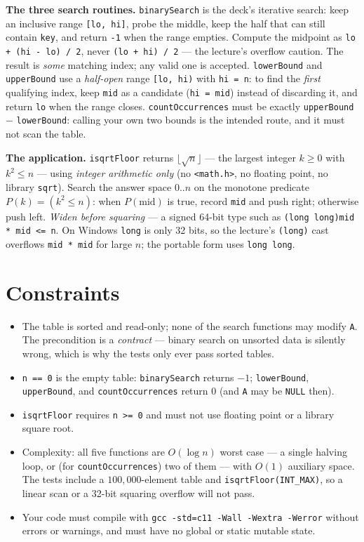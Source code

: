 \documentclass[11pt]{article}
\begin{document}
\textbf{The three search routines.} \texttt{binarySearch} is the deck's iterative search: keep an inclusive range \texttt{[lo, hi]}, probe the middle, keep the half that can still contain \texttt{key}, and return \texttt{-1} when the range empties. Compute the midpoint as \texttt{lo + (hi - lo) / 2}, never \texttt{(lo + hi) / 2} --- the lecture's overflow caution. The result is \emph{some} matching index; any valid one is accepted. \texttt{lowerBound} and \texttt{upperBound} use a \emph{half-open} range \texttt{[lo, hi)} with \texttt{hi = n}: to find the \emph{first} qualifying index, keep \texttt{mid} as a candidate (\texttt{hi = mid}) instead of discarding it, and return \texttt{lo} when the range closes. \texttt{countOccurrences} must be exactly \texttt{upperBound} $-$ \texttt{lowerBound}: calling your own two bounds is the intended route, and it must not scan the table.

\textbf{The application.} \texttt{isqrtFloor} returns $\lfloor\sqrt{n}\rfloor$ --- the largest integer $k \ge 0$ with $k^2 \le n$ --- using \emph{integer arithmetic only} (no \texttt{<math.h>}, no floating point, no library \texttt{sqrt}). Search the answer space $0..n$ on the monotone predicate $P(k) = (k^2 \le n)$: when $P(\text{mid})$ is true, record \texttt{mid} and push right; otherwise push left. \emph{Widen before squaring} --- a signed 64-bit type such as \texttt{(long long)mid * mid <= n}. On Windows \texttt{long} is only 32 bits, so the lecture's \texttt{(long)} cast overflows \texttt{mid * mid} for large $n$; the portable form uses \texttt{long long}.

\section{Constraints}

\begin{itemize}
  \item The table is sorted and read-only; none of the search functions may modify \texttt{A}. The precondition is a \emph{contract} --- binary search on unsorted data is silently wrong, which is why the tests only ever pass sorted tables.
  \item \texttt{n == 0} is the empty table: \texttt{binarySearch} returns $-1$; \texttt{lowerBound}, \texttt{upperBound}, and \texttt{countOccurrences} return $0$ (and \texttt{A} may be \texttt{NULL} then).
  \item \texttt{isqrtFloor} requires \texttt{n >= 0} and must not use floating point or a library square root.
  \item Complexity: all five functions are $O(\log n)$ worst case --- a single halving loop, or (for \texttt{countOccurrences}) two of them --- with $O(1)$ auxiliary space. The tests include a $100{,}000$-element table and \texttt{isqrtFloor(INT\_MAX)}, so a linear scan or a 32-bit squaring overflow will not pass.
  \item Your code must compile with \texttt{gcc -std=c11 -Wall -Wextra -Werror} without errors or warnings, and must have no global or static mutable state.
\end{itemize}
\end{document}
